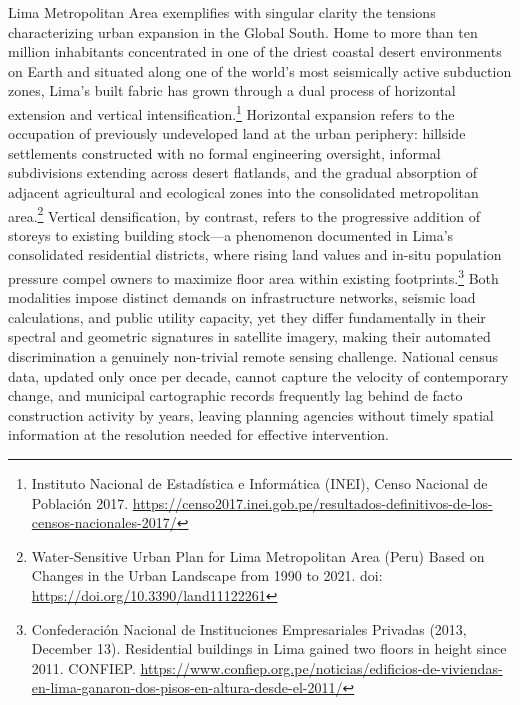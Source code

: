 Lima Metropolitan Area exemplifies with singular clarity the tensions
characterizing urban expansion in the Global South. Home to more than ten million
inhabitants concentrated in one of the driest coastal desert environments on
Earth and situated along one of the world's most seismically active subduction
zones, Lima's built fabric has grown through a dual process of horizontal
extension and vertical intensification.\footnote{Instituto Nacional de
Estadística e Informática (INEI), Censo Nacional de Población 2017.
\url{https://censo2017.inei.gob.pe/resultados-definitivos-de-los-censos-nacionales-2017/}}
Horizontal expansion refers to the occupation of previously undeveloped land at
the urban periphery: hillside settlements constructed with no formal engineering
oversight, informal subdivisions extending across desert flatlands, and the
gradual absorption of adjacent agricultural and ecological zones into the
consolidated metropolitan area.\footnote{Water-Sensitive Urban Plan for Lima
Metropolitan Area (Peru) Based on Changes in the Urban Landscape from 1990 to
2021. doi: \url{https://doi.org/10.3390/land11122261}}
Vertical densification, by contrast, refers to the progressive addition of
storeys to existing building stock---a phenomenon documented in Lima's
consolidated residential districts, where rising land values and in-situ
population pressure compel owners to maximize floor area within existing
footprints.\footnote{Confederación Nacional de Instituciones Empresariales
Privadas (2013, December 13). Residential buildings in Lima gained two floors
in height since 2011. CONFIEP.
\url{https://www.confiep.org.pe/noticias/edificios-de-viviendas-en-lima-ganaron-dos-pisos-en-altura-desde-el-2011/}}
Both modalities impose distinct demands on infrastructure networks, seismic load
calculations, and public utility capacity, yet they differ fundamentally in their
spectral and geometric signatures in satellite imagery, making their automated
discrimination a genuinely non-trivial remote sensing challenge. National census
data, updated only once per decade, cannot capture the velocity of contemporary
change, and municipal cartographic records frequently lag behind de facto
construction activity by years, leaving planning agencies without timely spatial
information at the resolution needed for effective intervention.

